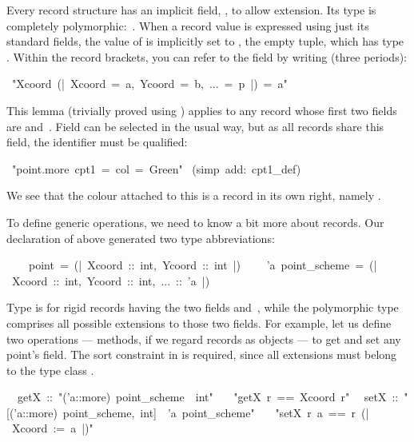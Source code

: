 Every record structure has an implicit field, , to allow
extension.  Its type is completely polymorphic:~.  When a
record value is expressed using just its standard fields, the value of
 is implicitly set to \isa{()}, the empty tuple, which has
type .  Within the record brackets, you can refer to the
 field by writing  (three periods):
\begin{isabelle}
\ "Xcoord\ (|\ Xcoord\ =\ a,\ Ycoord\ =\ b,\ ...\ =\ p\ |)\ =\ a"
\end{isabelle}
This lemma (trivially proved using ) applies to any
record whose first two fields are  and~.  Field
 can be selected in the usual way, but as all records share
this field, the identifier must be qualified:
\begin{isabelle}
\ "point.more\ cpt1\ =\ \isasymlparr col\ =\ Green\isasymrparr "\isanewline
{}\ (simp\ add:\ cpt1_def)
\end{isabelle}
%
We see that the colour attached to this  is a record in its
own right, namely 
.

To define generic operations, we need to know a bit more about records.
Our declaration of  above generated two type
abbreviations:
\begin{isabelle}
\ \ \ \ point\ =\ (|\ Xcoord\ ::\ int,\ Ycoord\ ::\ int\ |)\isanewline
\ \ \ \ 'a\ point_scheme\ =\ (|\ Xcoord\ ::\ int,\ Ycoord\ ::\ int,\ ...\ ::\ 'a\ |)
\end{isabelle}
%
Type  is for rigid records having the two fields
 and~, while the polymorphic type 
comprises all possible extensions to those two fields.  For example,
let us define two operations --- methods, if we regard records as
objects --- to get and set any point's
 field.  The sort constraint in  is
required, since all extensions must belong to the type class
.%
\begin{isabelle}
\ \ getX\ ::\ "('a::more)\ point_scheme\ \isasymRightarrow \ int"\isanewline
\ \ \ "getX\ r\ ==\ Xcoord\ r"\isanewline
\ \ setX\ ::\ "[('a::more)\ point_scheme,\ int]\ \isasymRightarrow \ 'a\ point_scheme"\isanewline
\ \ \ "setX\ r\ a\ ==\ r\ (|\ Xcoord\ :=\ a\ |)"
\end{isabelle}

